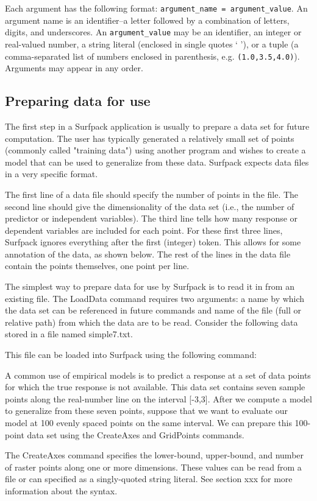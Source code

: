 \documentclass{article}
\begin{document}
Each argument has the following format: \texttt{argument\_name =
  argument\_value}.  An argument name is an identifier--a letter
followed by a combination of letters, digits, and underscores.  An
\texttt{argument\_value} may be an identifier, an integer or
real-valued number, a string literal (enclosed in single quotes ` '),
or a tuple (a comma-separated list of numbers enclosed in parenthesis,
e.g. \texttt{(1.0,3.5,4.0)}).  Arguments may appear in any order.

\subsection{Preparing data for use}\label{sec:format}
The first step in a Surfpack application is usually to prepare a data set for future computation.  The user has typically generated a relatively small set of points (commonly called "training data") using another program and wishes to create a model that can be used to generalize from these data.  Surfpack expects data files in a very specific format.

The first line of a data file should specify the number of points in the file.  The second line should give the dimensionality of the data set (i.e., the number of predictor or independent variables).  The third line tells how many response or dependent variables are included for each point.  For these first three lines, Surfpack ignores everything after the first (integer) token.  This allows for some annotation of the data, as shown below. 
The rest of the lines in the data file contain the points themselves, one point per
line.   



The simplest way to prepare data for use by Surfpack is to read it in from an existing file.  The LoadData command requires two arguments: a name by which the data set can be referenced in future commands and name of the file (full or relative path) from which the data are to be read.  Consider the following data stored in a file named simple7.txt.

This file can be loaded into Surfpack using the following command:

A common use of empirical models is to predict a response at a set of data points for which the true response is not available.  This data set contains seven sample points along the real-number line on the interval [-3,3].  After we compute a model to generalize from these seven points, suppose that we want to evaluate our model at 100 evenly spaced points on the same interval.  We can prepare this 100-point data set using the CreateAxes and GridPoints commands.

The CreateAxes command specifies the lower-bound, upper-bound, and number of raster points along one or more dimensions.  These values can be read from a file or can specified as a singly-quoted string literal.  See section xxx for more information about the syntax.
\end{document}
